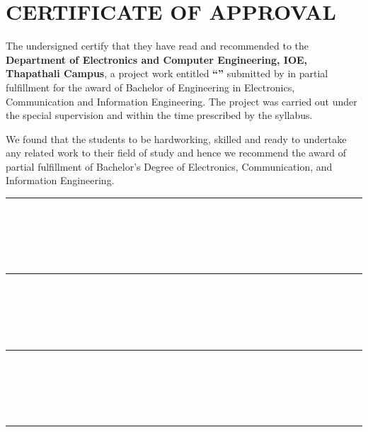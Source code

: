 \chapter*{CERTIFICATE OF APPROVAL}
{}

\noindent The undersigned certify that they have read and recommended to the
\textbf{Department of Electronics and Computer Engineering, IOE, Thapathali Campus},
a project work entitled \textbf{``\cTitle''} submitted by
\textbf{\authorList} in partial fulfillment for the award of Bachelor of
Engineering in Electronics, Communication and Information Engineering.
The project was carried out under the special supervision and within the time
prescribed by the syllabus.

\vspace{1em}

We found that the students to be hardworking, skilled and ready to undertake
any related work to their field of study and hence we recommend the award of
partial fulfillment of Bachelor's Degree of Electronics, Communication, and
Information Engineering.

\vspace{2em}

\noindent
\begin{minipage}[t]{0.48\textwidth}
    \rule{6cm}{0.2mm} \\
    \cSupervisorTitle \\
    \cSupervisor \\
    \cSupervisorDept \\
    \cSupervisorAddress
\end{minipage}
\begin{minipage}[t]{0.48\textwidth}
    \rule{6cm}{0.2mm} \\
    \cExternalExaminerTitle \\
    \cExternalExaminer \\
    \cExternalExaminerDept \\
    \cExternalExaminerAddress
\end{minipage}

\vspace{3em}

\noindent
\begin{minipage}[t]{0.48\textwidth}
    \rule{6cm}{0.2mm} \\
    \cProjectCoordinatorTitle \\
    \cProjectCoordinator \\
    \cProjectCoordinatorDept \\
    \cProjectCoordinatorAddress
\end{minipage}
\hfill
\begin{minipage}[t]{0.48\textwidth}
    \rule{6cm}{0.2mm} \\
    \cHODTitle \\
    \cHOD \\
    \cHODDept \\
    \cHODAddress
\end{minipage}

\vspace{2em}

\noindent\cDate

